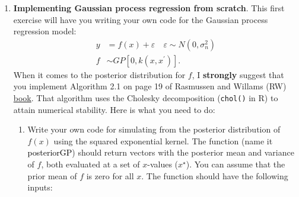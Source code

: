 \documentclass[11pt,english]{article}\usepackage[]{graphicx}\usepackage[]{color}
\begin{document}
\begin{enumerate}
\item \textbf{Implementing Gaussian process regression from scratch}. This
first exercise will have you writing your own code for the Gaussian
process regression model:
\begin{align*}
y & =f(x)+\varepsilon\quad\varepsilon\sim N(0,\sigma_{n}^{2})\\
f & \sim GP\left[0,k\left(x,x^{\prime}\right)\right].
\end{align*}
When it comes to the posterior distribution for $f$, I \textbf{strongly}
suggest that you implement Algorithm 2.1 on page 19 of Rasmussen and
Willams (RW) \href{http://www.gaussianprocess.org/gpml/chapters/RW2.pdf}{book}.
That algorithm uses the Cholesky decomposition (\texttt{chol()} in
R) to attain numerical stability. Here is what you need to do:

\begin{enumerate}
\item Write your own code for simulating from the posterior distribution
of $f(x)$ using the squared exponential kernel. The function (name
it \textsf{\textcolor{black}{posteriorGP}}) should return vectors
with the posterior mean and variance of $f$, both evaluated at a
set of $x$-values ($x^{\star}$). You can assume that the prior mean
of $f$ is zero for all $x$. The function should have the following
inputs:


\end{enumerate}
\end{enumerate}
\end{document}
